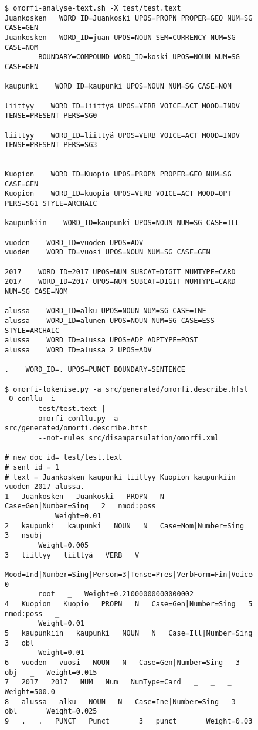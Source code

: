 \documentclass[a4paper,notitlepage]{article}
\begin{document}
\begin{figure}
    \begin{tiny}
        \begin{verbatim}$ omorfi-analyse-text.sh -X test/test.text
Juankosken   WORD_ID=Juankoski UPOS=PROPN PROPER=GEO NUM=SG CASE=GEN
Juankosken   WORD_ID=juan UPOS=NOUN SEM=CURRENCY NUM=SG CASE=NOM
        BOUNDARY=COMPOUND WORD_ID=koski UPOS=NOUN NUM=SG CASE=GEN

kaupunki    WORD_ID=kaupunki UPOS=NOUN NUM=SG CASE=NOM

liittyy    WORD_ID=liittyä UPOS=VERB VOICE=ACT MOOD=INDV TENSE=PRESENT PERS=SG0

liittyy    WORD_ID=liittyä UPOS=VERB VOICE=ACT MOOD=INDV TENSE=PRESENT PERS=SG3


Kuopion    WORD_ID=Kuopio UPOS=PROPN PROPER=GEO NUM=SG CASE=GEN
Kuopion    WORD_ID=kuopia UPOS=VERB VOICE=ACT MOOD=OPT PERS=SG1 STYLE=ARCHAIC

kaupunkiin    WORD_ID=kaupunki UPOS=NOUN NUM=SG CASE=ILL

vuoden    WORD_ID=vuoden UPOS=ADV
vuoden    WORD_ID=vuosi UPOS=NOUN NUM=SG CASE=GEN

2017    WORD_ID=2017 UPOS=NUM SUBCAT=DIGIT NUMTYPE=CARD
2017    WORD_ID=2017 UPOS=NUM SUBCAT=DIGIT NUMTYPE=CARD NUM=SG CASE=NOM

alussa    WORD_ID=alku UPOS=NOUN NUM=SG CASE=INE
alussa    WORD_ID=alunen UPOS=NOUN NUM=SG CASE=ESS STYLE=ARCHAIC
alussa    WORD_ID=alussa UPOS=ADP ADPTYPE=POST
alussa    WORD_ID=alussa_2 UPOS=ADV

.    WORD_ID=. UPOS=PUNCT BOUNDARY=SENTENCE

$ omorfi-tokenise.py -a src/generated/omorfi.describe.hfst -O conllu -i
        test/test.text |
        omorfi-conllu.py -a src/generated/omorfi.describe.hfst
        --not-rules src/disamparsulation/omorfi.xml

# new doc id= test/test.text
# sent_id = 1
# text = Juankosken kaupunki liittyy Kuopion kaupunkiin vuoden 2017 alussa.
1   Juankosken   Juankoski   PROPN   N   Case=Gen|Number=Sing   2   nmod:poss
        _   Weight=0.01
2   kaupunki   kaupunki   NOUN   N   Case=Nom|Number=Sing   3   nsubj   _
        Weight=0.005
3   liittyy   liittyä   VERB   V
        Mood=Ind|Number=Sing|Person=3|Tense=Pres|VerbForm=Fin|Voice=Act   0
        root   _   Weight=0.21000000000000002
4   Kuopion   Kuopio   PROPN   N   Case=Gen|Number=Sing   5   nmod:poss   _
        Weight=0.01
5   kaupunkiin   kaupunki   NOUN   N   Case=Ill|Number=Sing   3   obl   _
        Weight=0.01
6   vuoden   vuosi   NOUN   N   Case=Gen|Number=Sing   3   obj   _   Weight=0.015
7   2017   2017   NUM   Num   NumType=Card   _   _   _   Weight=500.0
8   alussa   alku   NOUN   N   Case=Ine|Number=Sing   3   obl   _   Weight=0.025
9   .   .   PUNCT   Punct   _   3   punct   _   Weight=0.03


\end{verbatim}
\end{tiny}
\end{figure}
\end{document}
